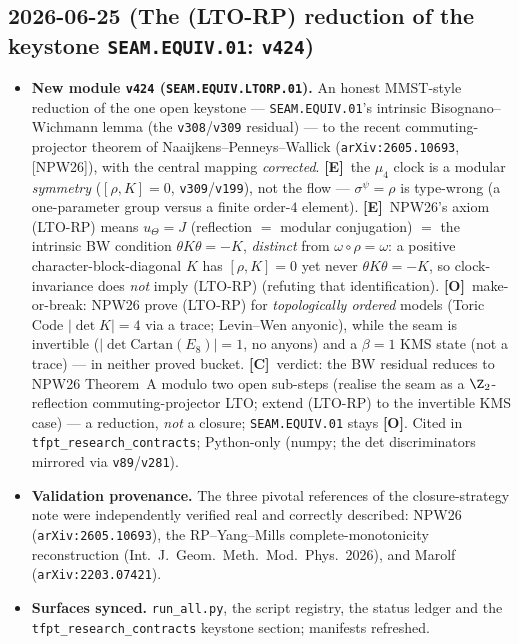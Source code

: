 \documentclass[11pt]{article}
\providecommand{\mE}{\textbf{[E]}}\providecommand{\mC}{\textbf{[C]}}
\providecommand{\mO}{\textbf{[O]}}\providecommand{\mX}{\textbf{[X]}}
\providecommand{\vref}[1]{\texttt{#1}}
\begin{document}
\subsection*{2026-06-25 (The (LTO-RP) reduction of the keystone \texttt{SEAM.EQUIV.01}: \texttt{v424})}
\begin{itemize}
\item \textbf{New module \texttt{v424} (\texttt{SEAM.EQUIV.LTORP.01}).} An honest MMST-style reduction of the one
open keystone --- \texttt{SEAM.EQUIV.01}'s intrinsic Bisognano--Wichmann lemma (the \vref{v308}/\vref{v309}
residual) --- to the recent commuting-projector theorem of Naaijkens--Penneys--Wallick (\texttt{arXiv:2605.10693},
[NPW26]), with the central mapping \emph{corrected}. \mE\ the $\mu_4$ clock is a modular \emph{symmetry}
($[\rho,K]{=}0$, \vref{v309}/\vref{v199}), not the flow --- $\sigma^\psi{=}\rho$ is type-wrong (a one-parameter
group versus a finite order-$4$ element). \mE\ NPW26's axiom (LTO-RP) means $u_\Theta{=}J$ (reflection $=$ modular
conjugation) $=$ the intrinsic BW condition $\theta K\theta{=}-K$, \emph{distinct} from $\omega{\circ}\rho{=}\omega$:
a positive character-block-diagonal $K$ has $[\rho,K]{=}0$ yet never $\theta K\theta{=}-K$, so clock-invariance does
\emph{not} imply (LTO-RP) (refuting that identification). \mO\ make-or-break: NPW26 prove (LTO-RP) for
\emph{topologically ordered} models (Toric Code $|\det K|{=}4$ via a trace; Levin--Wen anyonic), while the seam is
invertible ($|\det\mathrm{Cartan}(E_8)|{=}1$, no anyons) and a $\beta{=}1$ KMS state (not a trace) --- in neither
proved bucket. \mC\ verdict: the BW residual reduces to NPW26 Theorem~A modulo two open sub-steps (realise the seam
as a $\Z_2$-reflection commuting-projector LTO; extend (LTO-RP) to the invertible KMS case) --- a reduction, \emph{not}
a closure; \texttt{SEAM.EQUIV.01} stays \mO. Cited in \texttt{tfpt\_research\_contracts}; Python-only (numpy; the det
discriminators mirrored via \vref{v89}/\vref{v281}).
\item \textbf{Validation provenance.} The three pivotal references of the closure-strategy note were independently
verified real and correctly described: NPW26 (\texttt{arXiv:2605.10693}), the RP--Yang--Mills complete-monotonicity
reconstruction (Int.\ J.\ Geom.\ Meth.\ Mod.\ Phys.\ 2026), and Marolf (\texttt{arXiv:2203.07421}).
\item \textbf{Surfaces synced.} \texttt{run\_all.py}, the script registry, the status ledger and the
\texttt{tfpt\_research\_contracts} keystone section; manifests refreshed.
\end{itemize}
\end{document}
